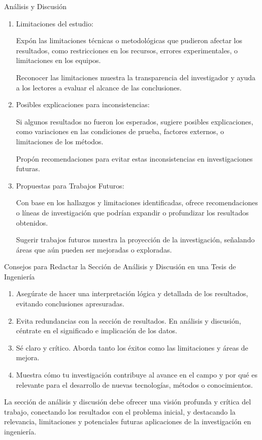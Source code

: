 \documentclass[9pt]{beamer}
\begin{document}
\begin{frame}{Análisis y Discusión}
\begin{enumerate}
    Reflexiona sobre las implicaciones teóricas de tus hallazgos, aportando a la base de conocimiento existente y sugiriendo cómo podrían influir en futuras investigaciones.

    \item Limitaciones del estudio:

    Expón las limitaciones técnicas o metodológicas que pudieron afectar los resultados, como restricciones en los recursos, errores experimentales, o limitaciones en los equipos.

    Reconocer las limitaciones muestra la transparencia del investigador y ayuda a los lectores a evaluar el alcance de las conclusiones.

    \item Posibles explicaciones para inconsistencias:

    Si algunos resultados no fueron los esperados, sugiere posibles explicaciones, como variaciones en las condiciones de prueba, factores externos, o limitaciones de los métodos.

    Propón recomendaciones para evitar estas inconsistencias en investigaciones futuras.

    \item Propuestas para Trabajos Futuros:

    Con base en los hallazgos y limitaciones identificadas, ofrece recomendaciones o líneas de investigación que podrían expandir o profundizar los resultados obtenidos.

    Sugerir trabajos futuros muestra la proyección de la investigación, señalando áreas que aún pueden ser mejoradas o exploradas.
\end{enumerate}


Consejos para Redactar la Sección de Análisis y Discusión en una Tesis de Ingeniería

\begin{enumerate}
    \item Asegúrate de hacer una interpretación lógica y detallada de los resultados, evitando conclusiones apresuradas.
    \item Evita redundancias con la sección de resultados. En análisis y discusión, céntrate en el significado e implicación de los datos.
    \item Sé claro y crítico. Aborda tanto los éxitos como las limitaciones y áreas de mejora.
    \item Muestra cómo tu investigación contribuye al avance en el campo y por qué es relevante para el desarrollo de nuevas tecnologías, métodos o conocimientos.
\end{enumerate}

La sección de análisis y discusión debe ofrecer una visión profunda y crítica del trabajo, conectando los resultados con el problema inicial, y destacando la relevancia, limitaciones y potenciales futuras aplicaciones de la investigación en ingeniería.
\end{frame}
\end{document}
